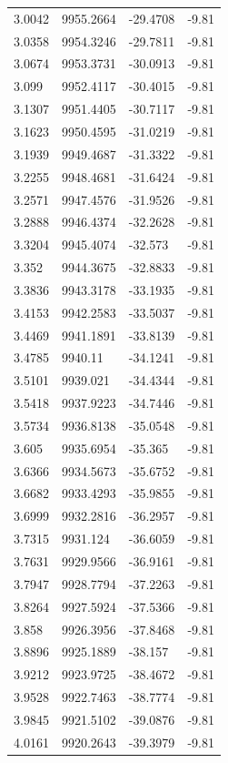 \begin{table}[H]
\begin{tabular}{llll}
3.0042 & 9955.2664 & -29.4708 & -9.81 \\
3.0358 & 9954.3246 & -29.7811 & -9.81 \\
3.0674 & 9953.3731 & -30.0913 & -9.81 \\
3.099 & 9952.4117 & -30.4015 & -9.81 \\
3.1307 & 9951.4405 & -30.7117 & -9.81 \\
3.1623 & 9950.4595 & -31.0219 & -9.81 \\
3.1939 & 9949.4687 & -31.3322 & -9.81 \\
3.2255 & 9948.4681 & -31.6424 & -9.81 \\
3.2571 & 9947.4576 & -31.9526 & -9.81 \\
3.2888 & 9946.4374 & -32.2628 & -9.81 \\
3.3204 & 9945.4074 & -32.573 & -9.81 \\
3.352 & 9944.3675 & -32.8833 & -9.81 \\
3.3836 & 9943.3178 & -33.1935 & -9.81 \\
3.4153 & 9942.2583 & -33.5037 & -9.81 \\
3.4469 & 9941.1891 & -33.8139 & -9.81 \\
3.4785 & 9940.11 & -34.1241 & -9.81 \\
3.5101 & 9939.021 & -34.4344 & -9.81 \\
3.5418 & 9937.9223 & -34.7446 & -9.81 \\
3.5734 & 9936.8138 & -35.0548 & -9.81 \\
3.605 & 9935.6954 & -35.365 & -9.81 \\
3.6366 & 9934.5673 & -35.6752 & -9.81 \\
3.6682 & 9933.4293 & -35.9855 & -9.81 \\
3.6999 & 9932.2816 & -36.2957 & -9.81 \\
3.7315 & 9931.124 & -36.6059 & -9.81 \\
3.7631 & 9929.9566 & -36.9161 & -9.81 \\
3.7947 & 9928.7794 & -37.2263 & -9.81 \\
3.8264 & 9927.5924 & -37.5366 & -9.81 \\
3.858 & 9926.3956 & -37.8468 & -9.81 \\
3.8896 & 9925.1889 & -38.157 & -9.81 \\
3.9212 & 9923.9725 & -38.4672 & -9.81 \\
3.9528 & 9922.7463 & -38.7774 & -9.81 \\
3.9845 & 9921.5102 & -39.0876 & -9.81 \\
4.0161 & 9920.2643 & -39.3979 & -9.81 \\

\end{tabular}
\end{table}
